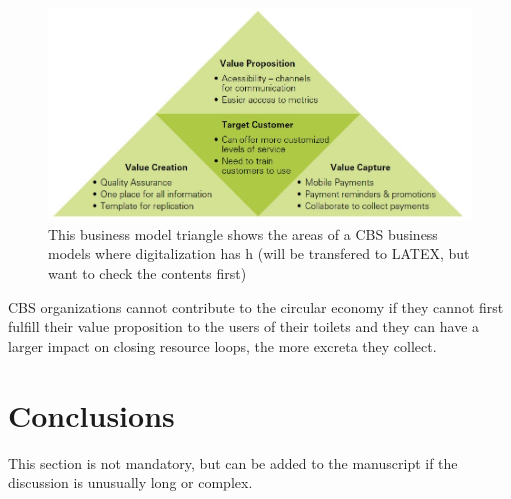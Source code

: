 \documentclass[sustainability,article,submit,moreauthors,pdftex,10pt,a4paper]{mdpi}
\theoremstyle{mdpi}
\newcounter{ex}
\newcounter{re}
\theoremstyle{mdpidefinition}
\begin{document}
\begin{figure}[H]
\centering
\includegraphics[width=\textwidth]{bmt.jpg}
\caption{This business model triangle shows the areas of a CBS business models where digitalization has h (will be transfered to LATEX, but want to check the contents first)}
\label{fig:bmt}
\end{figure}  

CBS organizations cannot contribute to the circular economy if they cannot first fulfill their value proposition to the users of their toilets and they can have a larger impact on closing resource loops, the more excreta they collect.  

\section{Conclusions}

This section is not mandatory, but can be added to the manuscript if the discussion is unusually long or complex.

\vspace{6pt} 


% 
% 
% 
% 
\end{document}
